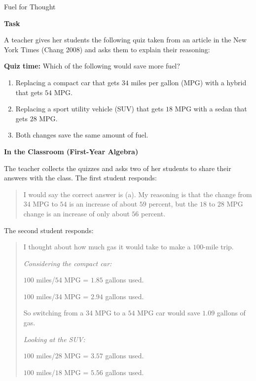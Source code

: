 \TriExample
  {Fuel for Thought}
  {
    \textbf{Task}

    A teacher gives her students the following quiz taken from an article in the New York Times (Chang 2008) and asks them to explain their reasoning:

    \textbf{Quiz time:} Which of the following would save more fuel?

    \begin{enumerate}
      \item [(a)] Replacing a compact car that gets $34$ miles per gallon (MPG) with a hybrid that gets $54$ MPG.
      
      \item [(b)] Replacing a sport utility vehicle (SUV) that gets $18$ MPG with a sedan that gets $28$ MPG.\vspace{\baselineskip}
      
      \item [(c)] Both changes save the same amount of fuel.
    \end{enumerate}

    \textbf{In the Classroom (First-Year Algebra)}

    The teacher collects the quizzes and asks two of her students to share their answers with the class. The first student responds:

    \begin{quote}
      I would say the correct answer is (a). My reasoning is that the change from $34$ MPG to $54$ is an increase of about $59$ percent, but the $18$ to $28$ MPG change is an increase of only about $56$ percent.
    \end{quote}

    The second student responds:

    \begin{quote}
      I thought about how much gas it would take to make a $100$-mile trip.

      \emph{Considering the compact car:}

      $100$ miles/$5$4 MPG = $1.85$ gallons used.

      $100$ miles/$34$ MPG = $2.94$ gallons used.

      So switching from a $3$4 MPG to a $54$ MPG car would save $1.09$ gallons of gas.

      \emph{Looking at the SUV:}

      $100$ miles/$28$ MPG = $3.57$ gallons used.

      $100$ miles/$18$ MPG = $5.56$ gallons used.


\end{quote}}
